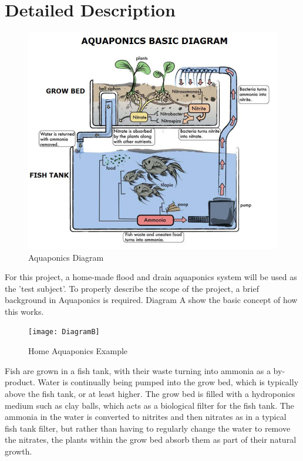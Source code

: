 \documentclass[11pt, oneside, a4paper, titlepage]{article}
\begin{document}
\section{Detailed Description}
\begin{figure}
	\includegraphics[width=1\linewidth]{DiagramA} 
	\caption{Aquaponics Diagram}
	\label{fig:drawing}
\end{figure}

For this project, a home-made flood and drain aquaponics system will be used as the 'test subject'. To properly describe the scope of the project, a brief background in Aquaponics is required. Diagram A show the basic concept of how this works.  

\begin{figure}
	\texttt{[image: DiagramB]} 
	\caption{Home Aquaponics Example}
	\label{fig:Aquaponics}
\end{figure}

Fish are grown in a fish tank, with their waste turning into ammonia as a by-product.  Water is continually being pumped into the grow bed, which is typically above the fish tank, or at least higher. The grow bed is filled with a hydroponics medium such as clay balls, which acts as a biological filter for the fish tank. The ammonia in the water is converted to nitrites and then nitrates as in a typical fish tank filter, but rather than having to regularly change the water to remove the nitrates, the plants within the grow bed absorb them as part of their natural growth.  
\end{document}
